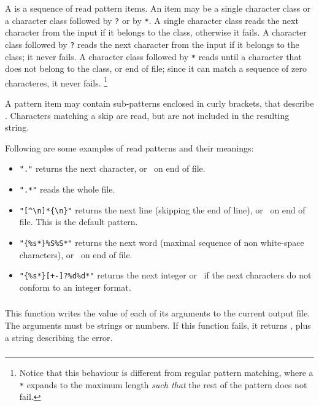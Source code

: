 A  is a sequence of read pattern items.
An item may be a single character class
or a character class followed by \verb'?' or by \verb'*'.
A single character class reads the next character from the input
if it belongs to the class, otherwise it fails.
A character class followed by \verb'?' reads the next character
from the input if it belongs to the class;
it never fails.
A character class followed by \verb'*' reads until a character that
does not belong to the class, or end of file;
since it can match a sequence of zero characteres, it never fails.%
\footnote{
Notice that this behaviour is different from regular pattern matching,
where a \verb'*' expands to the maximum length {\em such that\/}
the rest of the pattern does not fail.}

A pattern item may contain sub-patterns enclosed in curly brackets,
that describe .
Characters matching a skip are read,
but are not included in the resulting string.

Following are some examples of read patterns and their meanings:
\begin{itemize}
\item \verb|"."| returns the next character, or \nil\ on end of file.
\item \verb|".*"| reads the whole file.
\item \verb|"[^\n]*{\n}"| returns the next line
(skipping the end of line), or \nil\ on end of file.
This is the default pattern.
\item \verb|"{%s*}%S%S*"| returns the next word
(maximal sequence of non white-space characters),
or \nil\ on end of file.
\item \verb|"{%s*}[+-]?%d%d*"| returns the next integer
or \nil\ if the next characters do not conform to an integer format.
\end{itemize}

\subsubsection*{}

This function writes the value of each of its arguments to the
current output file.
The arguments must be strings or numbers.
If this function fails, it returns \nil,
plus a string describing the error.

\subsubsection*{}

